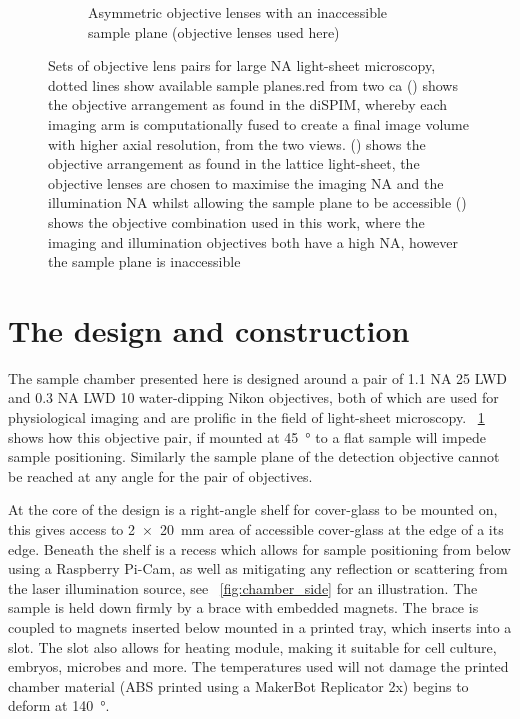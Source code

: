 \begin{figure}
\begin{subfigure}[t]{0.45\linewidth}
        \caption{Asymmetric objective lenses with an inaccessible \gls{sample plane} (objective lenses used here)}\label{fig:assymetric_nikon}
    \end{subfigure}
    \label{}
    \caption{
    Sets of objective lens pairs for large \gls{NA} \gls{light-sheet} microscopy, dotted lines show available sample planes.red from two ca
    () shows the objective arrangement as found in the \gls{diSPIM}, whereby each imaging arm is computationally fused to create a final image volume with higher axial resolution, from the two views.
    () shows the objective arrangement as found in the \gls{lattice light-sheet}, the objective lenses are chosen to maximise the imaging \gls{NA} and the illumination \gls{NA} whilst allowing the sample plane to be accessible
    () shows the objective combination used in this work, where the imaging and illumination objectives both have a high \gls{NA}, however the \gls{sample plane} is inaccessible
    }
    \label{fig:objective_matching}
\end{figure}

\section{The design and construction}

The sample chamber presented here is designed around a pair of 1.1 \gls{NA} \SI{25}{\times} \gls{LWD} and 0.3 \gls{NA} LWD \SI{10}{\times} water-dipping Nikon objectives, both of which are used for physiological imaging and are prolific in the field of light-sheet microscopy.
\figurename~\ref{fig:assymetric_nikon} shows how this objective pair, if mounted at \SI{45}{\degree} to a flat sample will impede sample positioning.
Similarly the sample plane of the detection objective cannot be reached at any angle for the pair of objectives.

At the core of the design is a right-angle shelf for cover-glass to be mounted on, this gives access to \SI{2x20}{\milli\metre} area of accessible cover-glass at the edge of a its edge.
Beneath the shelf is a recess which allows for sample positioning from below using a Raspberry Pi-Cam, as well as mitigating any reflection or scattering from the laser illumination source, see \figurename~\ref{fig:chamber_side} for an illustration.
The sample is held down firmly by a  brace with embedded magnets.
The brace is coupled to magnets inserted below mounted in a printed tray, which inserts into a slot.
The slot also allows for heating module, making it suitable for cell culture, embryos, microbes and more.
The temperatures used will not damage the printed chamber material (\gls{ABS} printed using a MakerBot Replicator 2x) begins to deform at \SI{140}{\degree}.

